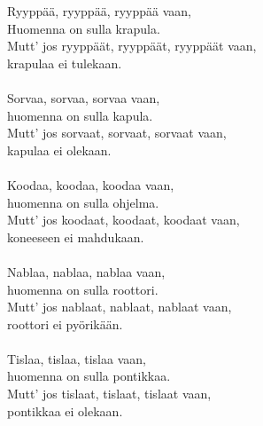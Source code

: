 
Ryyppää, ryyppää, ryyppää vaan, \\ Huomenna on sulla krapula. \\ Mutt' jos ryyppäät, ryyppäät, ryyppäät vaan, \\ krapulaa ei tulekaan. \\ \hspace{10mm} \\ Sorvaa, sorvaa, sorvaa vaan, \\ huomenna on sulla kapula. \\ Mutt' jos sorvaat, sorvaat, sorvaat vaan, \\ kapulaa ei olekaan. \\ \hspace{10mm} \\ Koodaa, koodaa, koodaa vaan, \\ huomenna on sulla ohjelma. \\ Mutt' jos koodaat, koodaat, koodaat vaan, \\ koneeseen ei mahdukaan. \\ \hspace{10mm} \\ Nablaa, nablaa, nablaa vaan, \\ huomenna on sulla roottori. \\ Mutt' jos nablaat, nablaat, nablaat vaan, \\ roottori ei pyörikään. \\ \hspace{10mm} \\ Tislaa, tislaa, tislaa vaan, \\ huomenna on sulla pontikkaa. \\ Mutt' jos tislaat, tislaat, tislaat vaan, \\ pontikkaa ei olekaan.